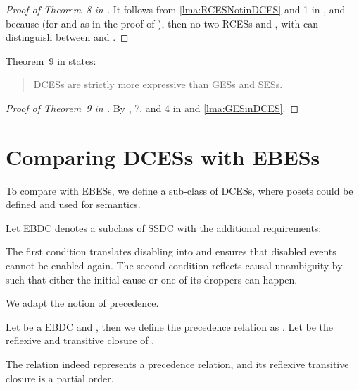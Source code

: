\documentclass[runningheads,a4paper]{llncs}
\begin{document}
\begin{proof}[Proof of Theorem~8 in \cite{dynamicCausality15}]
It follows from \lems\ref{lma:RCESNotinDCES} and 1 in \cite{dynamicCausality15}, and because  (for  and  as in the proof of ), then no two RCESs  and , with  can distinguish between  and .
\end{proof}

Theorem~9 in \cite{dynamicCausality15} states:
\begin{quote}
DCESs are strictly more expressive than GESs and SESs.
\end{quote}

\begin{proof}[Proof of Theorem~9 in \cite{dynamicCausality15}]
By , 7, and 4 in \cite{dynamicCausality15} and \lem\ref{lma:GESinDCES}.
\end{proof}


\section{Comparing DCESs with EBESs}
\label{sec:EBESsWithDCESs}
To compare with EBESs, we define a sub-class of DCESs, where posets could be
defined and used for semantics.

\begin{definition}
\label{def:EBDC}
Let EBDC denotes a subclass of SSDC with the additional requirements:
	\begin{inparaenum}
		\item \label{eq:EBDCOnlyDisabling} 
		\item \label{eq:NoCausalAmbiguity} 
	\end{inparaenum}
\end{definition}

The first condition translates disabling into  and ensures that
disabled events cannot be enabled again. The second condition reflects causal
unambiguity by  such that either the initial
cause or one of its droppers can happen.

We adapt the notion of precedence.

\begin{definition}
\label{def:EBDCLposets}
Let  be a EBDC and , then we define the
precedence relation  as . Let  be the reflexive and
transitive closure of .
\end{definition}

The relation  indeed represents a precedence relation, and its
reflexive transitive closure is a partial order.
\end{document}
